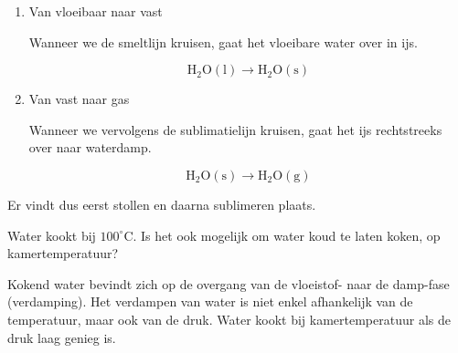 \documentclass{ximera}
\begin{document}
\begin{exercise}
\begin{solution}
\begin{enumerate}
    \item Van vloeibaar naar vast
    
    Wanneer we de smeltlijn kruisen, gaat het vloeibare water over in ijs.

    \[
    \mathrm{H_2O(l) \rightarrow H_2O(s)}
    \]

    \item Van vast naar gas

    Wanneer we vervolgens de sublimatielijn kruisen, gaat het ijs rechtstreeks over naar waterdamp.

    \[
    \mathrm{H_2O(s) \rightarrow H_2O(g)}
    \]

\end{enumerate}

Er vindt dus eerst stollen en daarna sublimeren plaats.

\end{solution}

\end{exercise}


\begin{exercise}

Water kookt bij $100^\circ$C. Is het ook mogelijk om water koud te laten koken, op kamertemperatuur?

\begin{solution}

Kokend water bevindt zich op de overgang van de vloeistof- naar de damp-fase (verdamping). Het verdampen van water is niet enkel afhankelijk van de temperatuur, maar ook van de druk. Water kookt bij kamertemperatuur als de druk laag genieg is.

\end{solution}

\end{exercise}
\end{document}
